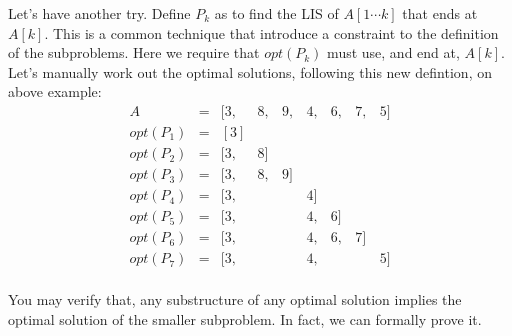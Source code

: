 Let's have another try. Define $P_k$ as to find the LIS of $A[1\cdots k]$ that ends at $A[k]$.
This is a common technique that introduce a constraint to the definition of the subproblems.
Here we require that $opt(P_k)$ must use, and end at, $A[k]$. Let's manually work out
the optimal solutions, following this new defintion, on above example:
\begin{displaymath}
\begin{array}{rllllllll}
A & = & [3, &8, &9, &4, &6, &7, &5] \\
opt(P_1) &=& [3] \\
opt(P_2) &=& [3, &8] \\
opt(P_3) &=& [3, &8, &9] \\
opt(P_4) &=& [3, &&&4] \\
opt(P_5) &=& [3, &&&4, &6] \\
opt(P_6) &=& [3, &&&4, &6, &7] \\
opt(P_7) &=& [3, &&&4, &&&5] \\
\end{array}
\end{displaymath}

You may verify that, any substructure of any optimal solution implies the optimal
solution of the smaller subproblem. In fact, we can formally prove it.

%

